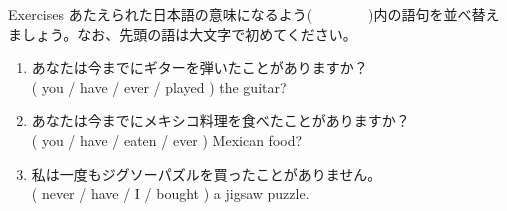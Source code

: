 \documentclass[aspectratio=169,xcolor={dvipsnames,table}]{beamer}
\begin{document}
\begin{frame}[plain]{Exercises}
あたえられた日本語の意味になるよう(~~~~~~~~)内の語句を並べ替えましょう。なお、先頭の語は大文字で初めてください。

\vspace{-10pt}
 \begin{enumerate}
  \item あなたは今までにギターを弾いたことがありますか？\\
( you / have / ever / played ) the guitar?\\
\vspace{-10pt}
  \item あなたは今までにメキシコ料理を食べたことがありますか？\hfill{}\,\,\\
( you / have / eaten / ever ) Mexican food?\\
  \item 私は一度もジグソーパズルを買ったことがありません。\\
( never / have / I / bought ) a jigsaw puzzle.\\
 \end{enumerate}

\vspace{-65pt}

\mbox{}\hfill{}
\end{frame}
\end{document}
